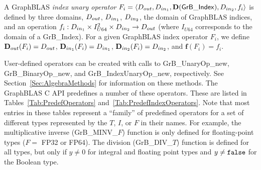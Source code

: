A GraphBLAS \emph{index unary operator} 
$F_i = \langle \mbox{$D_{out}$}, \mbox{$D_{in_{1}}$}, \mathbf{D}({\sf GrB\_Index}), \mbox{$D_{in_{2}}$}, f_{i} \rangle$
is defined by three domains, $\mbox{$D_{out}$}$, $\mbox{$D_{in_{1}}$}$, $\mbox{$D_{in_{2}}$}$, the domain of GraphBLAS 
indices, and an operation
$f_i: \mbox{$D_{in_{1}}$} \times I_{U64}^2 \times \mbox{$D_{in_{2}}$} \rightarrow \mbox{$D_{out}$}$ (where $I_{U64}$ corresponds to the domain of a {\sf GrB\_Index}).  For a given GraphBLAS 
index operator $F_i$, we define $\mbox{$\mathbf{D}_{out}$}(F_i) = \mbox{$D_{out}$}$, 
$\mbox{$\mathbf{D}_{in_{1}}$}(F_i) = \mbox{$D_{in_{1}}$}$, $\mbox{$\mathbf{D}_{in_{2}}$}(F_i) = \mbox{$D_{in_{2}}$}$, and $\mathbf{f}(F_i) = f_i$.

User-defined operators can be created with calls to {\sf GrB\_UnaryOp\_new}, 
{\sf GrB\_BinaryOp\_new}, and {\sf GrB\_IndexUnaryOp\_new}, respectively.  
See Section~\ref{Sec:AlgebraMethods} for information on these methods.
The GraphBLAS C API predefines a number of these operators.  These are listed 
in Tables~\ref{Tab:PredefOperators} and~\ref{Tab:PredefIndexOperators}.  
Note that most entries in these tables represent a
``family'' of predefined operators for a set of different types represented by
the $T$, $I$, or $F$ in their names.  For example, the multiplicative inverse 
({\sf GrB\_MINV\_$F$}) function is only defined
for floating-point types ($F = $ {\sf FP32} or {\sf FP64}).  The division
({\sf GrB\_DIV\_$T$}) function is defined for all types, but only if $y
\neq 0$ for integral  and floating point types and $y \neq {\tt false}$ for 
the Boolean type.

